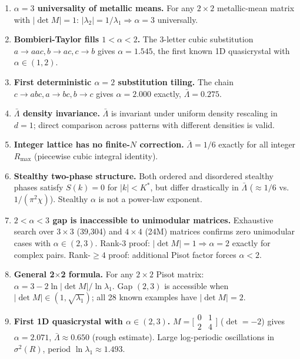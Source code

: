 \documentclass[11pt,letterpaper]{article}
\begin{document}
\begin{enumerate}
  \item \textbf{$\alpha = 3$ universality of metallic means.} For any $2\times2$
        metallic-mean matrix with $|\det M| = 1$: $|\lambda_2| = 1/\lambda_1 \Rightarrow
        \alpha = 3$ universally.

  \item \textbf{Bombieri-Taylor fills $1 < \alpha < 2$.} The 3-letter cubic substitution
        $a \to aac, b \to ac, c \to b$ gives $\alpha = 1.545$, the first known 1D
        quasicrystal with $\alpha \in (1,2)$.

  \item \textbf{First deterministic $\alpha = 2$ substitution tiling.} The chain
        $c \to abc, a \to bc, b \to c$ gives $\alpha = 2.000$ exactly,
        $\bar\Lambda = 0.275$.

  \item \textbf{$\bar\Lambda$ density invariance.} $\bar\Lambda$ is invariant under
        uniform density rescaling in $d=1$; direct comparison across patterns with
        different densities is valid.

  \item \textbf{Integer lattice has no finite-$N$ correction.} $\bar\Lambda = 1/6$
        exactly for all integer $R_\text{max}$ (piecewise cubic integral identity).

  \item \textbf{Stealthy two-phase structure.} Both ordered and disordered stealthy
        phases satisfy $S(k) = 0$ for $|k| < K^*$, but differ drastically in $\bar\Lambda$
        ($\approx 1/6$ vs.\ $1/(\pi^2\chi)$). Stealthy $\alpha$ is not a power-law exponent.

  \item \textbf{$2 < \alpha < 3$ gap is inaccessible to unimodular matrices.}
        Exhaustive search over $3\times3$ (39,304) and $4\times4$ (24M) matrices
        confirms zero unimodular cases with $\alpha \in (2,3)$.
        Rank-3 proof: $|\det M|=1 \Rightarrow \alpha=2$ exactly for complex pairs.
        Rank-$\geq4$ proof: additional Pisot factor forces $\alpha < 2$.

  \item \textbf{General 2$\times$2 formula.} For any $2\times2$ Pisot matrix:
        $\alpha = 3 - 2\ln|\det M|/\ln\lambda_1$. Gap $(2,3)$ is accessible when
        $|\det M| \in (1, \sqrt{\lambda_1})$; all 28 known examples have $|\det M|=2$.

  \item \textbf{First 1D quasicrystal with $\alpha \in (2,3)$.}
        $M = \bigl[\begin{smallmatrix}0&1\\2&4\end{smallmatrix}\bigr]$ ($\det=-2$)
        gives $\alpha = 2.071$, $\bar\Lambda \approx 0.650$ (rough estimate).
        Large log-periodic oscillations in $\sigma^2(R)$, period $\ln\lambda_1 \approx 1.493$.


\end{enumerate}
\end{document}
